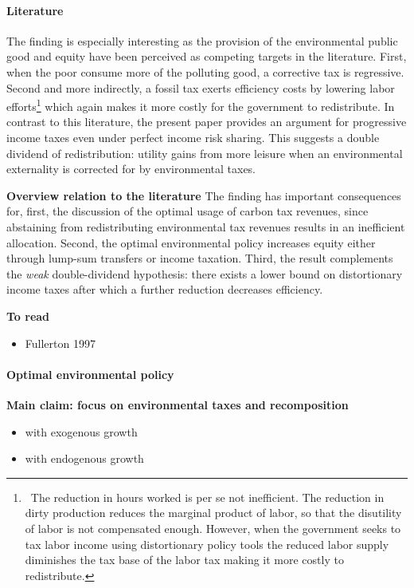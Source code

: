 \paragraph{Literature}

The finding is especially interesting as the provision of the environmental public good and equity have been perceived as competing targets in the literature. First, when the poor consume more of the polluting good, a corrective tax is regressive. Second and more indirectly, a fossil tax exerts efficiency costs by lowering labor efforts\footnote{\ The reduction in hours worked is per se not inefficient. The reduction in dirty production reduces the marginal product of labor, so that the disutility of labor is not compensated enough. However, when the government seeks to tax labor income using distortionary policy tools the reduced labor supply diminishes the tax base of the labor tax making it more costly to redistribute.} which again makes it more costly for the government to redistribute. 
In contrast to this literature, the present paper provides an argument for progressive income taxes even under perfect income risk sharing. This suggests a double dividend of redistribution: utility gains from more leisure when an environmental externality is corrected for by environmental taxes.



\textbf{Overview relation to the literature}
	The finding has important consequences for, first, the discussion of the optimal usage of carbon tax revenues, since abstaining from redistributing environmental tax revenues results in an inefficient allocation. Second, the optimal environmental policy increases equity either through lump-sum transfers or income taxation. Third, the result complements the \textit{weak} double-dividend hypothesis: there exists a lower bound on distortionary income taxes after which a further reduction decreases efficiency.

\textbf{To read}
\begin{itemize}
	\item Fullerton 1997
\end{itemize}
\paragraph{Optimal environmental policy}
\textbf{Main claim: focus on environmental taxes and recomposition}
\begin{itemize}
	\item with exogenous growth
	\item with endogenous growth
\end{itemize}

